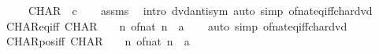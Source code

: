 \begin{isabellebody}
\ \ \ \ \ {\isachardoublequoteopen}CHAR\ {\isacharequal}{\kern0pt}\ c{\isachardoublequoteclose}\isanewline
%
\isadelimproof
\ \ %
\endisadelimproof
%
\isatagproof
{}\isamarkupfalse%
\ assms\ \isamarkupfalse%
\ {\isacharparenleft}{\kern0pt}intro\ dvd{\isacharunderscore}{\kern0pt}antisym{\isacharparenright}{\kern0pt}\ {\isacharparenleft}{\kern0pt}auto\ simp{\isacharcolon}{\kern0pt}\ of{\isacharunderscore}{\kern0pt}nat{\isacharunderscore}{\kern0pt}eq{\isacharunderscore}{\kern0pt}{}{\isacharunderscore}{\kern0pt}iff{\isacharunderscore}{\kern0pt}char{\isacharunderscore}{\kern0pt}dvd{\isacharparenright}{\kern0pt}%
\endisatagproof
{\isafoldproof}%
%
\isadelimproof
\isanewline
%
\endisadelimproof
\isanewline
{}\isamarkupfalse%
\ CHAR{\isacharunderscore}{\kern0pt}eq{}{\isacharunderscore}{\kern0pt}iff{\isacharcolon}{\kern0pt}\ {\isachardoublequoteopen}CHAR\ {\isacharequal}{\kern0pt}\ {}\ {\isasymlongleftrightarrow}\ {\isacharparenleft}{\kern0pt}{\isasymforall}n{\isachargreater}{\kern0pt}{}{\isachardot}{\kern0pt}\ of{\isacharunderscore}{\kern0pt}nat\ n\ {\isasymnoteq}\ {\isacharparenleft}{\kern0pt}{}{\isacharcolon}{\kern0pt}{\isacharcolon}{\kern0pt}{\isacharprime}{\kern0pt}a{\isacharparenright}{\kern0pt}{\isacharparenright}{\kern0pt}{\isachardoublequoteclose}\isanewline
%
\isadelimproof
\ \ %
\endisadelimproof
%
\isatagproof
{}\isamarkupfalse%
\ {\isacharparenleft}{\kern0pt}auto\ simp{\isacharcolon}{\kern0pt}\ of{\isacharunderscore}{\kern0pt}nat{\isacharunderscore}{\kern0pt}eq{\isacharunderscore}{\kern0pt}{}{\isacharunderscore}{\kern0pt}iff{\isacharunderscore}{\kern0pt}char{\isacharunderscore}{\kern0pt}dvd{\isacharparenright}{\kern0pt}%
\endisatagproof
{\isafoldproof}%
%
\isadelimproof
\isanewline
%
\endisadelimproof
\isanewline
{}\isamarkupfalse%
\ CHAR{\isacharunderscore}{\kern0pt}pos{\isacharunderscore}{\kern0pt}iff{\isacharcolon}{\kern0pt}\ {\isachardoublequoteopen}CHAR\ {\isachargreater}{\kern0pt}\ {}\ {\isasymlongleftrightarrow}\ {\isacharparenleft}{\kern0pt}{\isasymexists}n{\isachargreater}{\kern0pt}{}{\isachardot}{\kern0pt}\ of{\isacharunderscore}{\kern0pt}nat\ n\ {\isacharequal}{\kern0pt}\ {\isacharparenleft}{\kern0pt}{}{\isacharcolon}{\kern0pt}{\isacharcolon}{\kern0pt}{\isacharprime}{\kern0pt}a{\isacharparenright}{\kern0pt}{\isacharparenright}{\kern0pt}{\isachardoublequoteclose}\isanewline
%
\isadelimproof
\ \ %
\endisadelimproof
%
\isatagproof
{}\isamarkupfalse%

\end{isabellebody}
